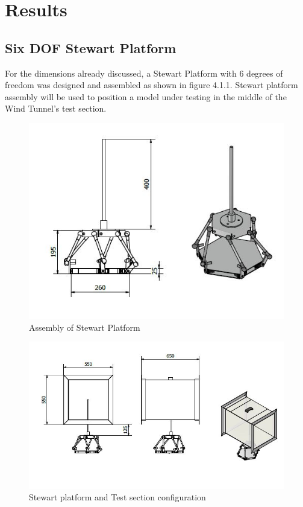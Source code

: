 \chapter{Results}
\section{Six DOF Stewart Platform}
For the dimensions already discussed, a Stewart Platform with 6 degrees of freedom was designed and assembled as shown in figure 4.1.1.
Stewart platform assembly will be used to position a model under testing in the middle of the Wind Tunnel's test section.
\begin{center}
	\begin{figure}[H]
	\centering
	\includegraphics[width=0.8\linewidth]{Figures/Assembly}
	\caption[Assembled Platform]{Assembly of Stewart Platform}
	\end{figure}
\end{center}
\begin{center}
	\begin{figure}[H]
	\centering
	\includegraphics[width=0.8\linewidth]{Figures/Test-section}
	\caption[Model placement in Test Section]{Stewart platform and Test section configuration}
	\end{figure}
\end{center}
\clearpage
